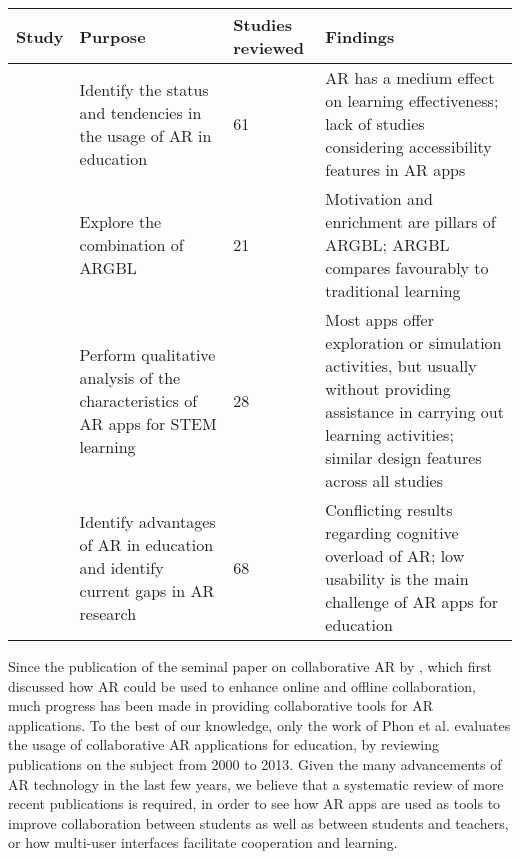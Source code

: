 \begin{table*}[htbp]
\small
\begin{tabular}{M{2.8cm}M{2.9cm}M{1.4cm}M{4.5cm}}
    \toprule
         \textbf{Study} & \textbf{Purpose} & \textbf{Studies reviewed} & \textbf{Findings} \\
    \midrule
         \cite{garzon2019systematic} & Identify the status and tendencies in the usage of \gls{AR} in education & 61 & \gls{AR} has a medium effect on learning effectiveness; lack of studies considering accessibility features in \gls{AR} apps \\
    \midrule     
          \cite{pellas2019augmenting} & Explore the combination of \gls{ARGBL} & 21 & Motivation and enrichment are pillars of \gls{ARGBL}; \gls{ARGBL} compares favourably to traditional learning \\
   \midrule 
        \cite{ibanez2018augmented} & Perform qualitative analysis of the characteristics of \gls{AR} apps for \gls{STEM} learning & 28 & Most apps offer exploration or simulation activities, but usually without providing assistance in carrying out learning activities; similar design features across all studies \\
    \midrule
         \cite{akccayir2017advantages} & Identify advantages of \gls{AR} in education and identify current gaps in \gls{AR} research & 68 & Conflicting results regarding cognitive overload of \gls{AR}; low usability is the main challenge of \gls{AR} apps for education \\
    \bottomrule

\end{tabular}
\caption{\fontsize{10pt}{11pt}}
\label{tab:slrsummary}
\end{table*}

Since the publication of the seminal paper on collaborative \gls{AR} by \cite{billinghurst2002collaborative}, which first discussed how AR could be used to enhance online and offline collaboration, much progress has been made in providing collaborative tools for \gls{AR} applications. To the best of our knowledge, only the work of Phon et al. \cite{6821833} evaluates the usage of collaborative \gls{AR} applications for education, by reviewing publications on the subject from 2000 to 2013. Given the many advancements of AR technology in the last few years, we believe that a systematic review of more recent publications is required, in order to see how AR apps are used as tools to improve collaboration between students as well as between students and teachers, or how multi-user interfaces facilitate cooperation and learning. 

